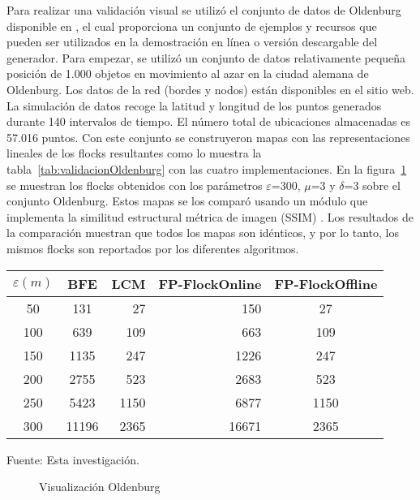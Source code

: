 Para realizar una validación visual se utilizó el conjunto de datos de Oldenburg disponible en \cite{Brin:2010:Online}, el cual proporciona un conjunto de ejemplos y 
recursos que pueden ser utilizados en la demostración en línea o 
versión descargable del generador. Para empezar, se utilizó un conjunto de datos relativamente pequeña posición de 1.000 objetos en movimiento 
al azar en la ciudad alemana de Oldenburg. Los datos de la red (bordes y nodos) están disponibles en el sitio web. La simulación de datos recoge la latitud y longitud de los puntos generados durante 140 intervalos 
de tiempo. El número total de ubicaciones almacenadas es 57.016 puntos. Con este conjunto se construyeron mapas con las representaciones lineales de 
los flocks resultantes como lo muestra la tabla~\ref{tab:validacionOldenburg} con las cuatro implementaciones.
En la figura~\ref{fig:validation} se muestran los flocks obtenidos con los parámetros $\varepsilon$=300, $\mu$=3 y $\delta$=3 sobre el conjunto Oldenburg.
Estos mapas se los comparó usando un 
módulo que implementa la similitud estructural métrica de imagen (SSIM) 
\cite{Zhou2004}. Los resultados de la comparación muestran que todos los mapas son 
idénticos, y por lo tanto, los mismos flocks son reportados por los diferentes 
algoritmos.


\begin{table*}
\caption{Número de flocks generados por los algoritmos en el conjunto de Oldenburg $\mu$=3, $\delta$=3}
\label{tab:validacionOldenburg}
\centering
\begin{tabular}{c c r r c}
\toprule
$\varepsilon(m)$& BFE & LCM & FP-FlockOnline & FP-FlockOffline \\  

\midrule
50 & 131 & 27 & 150 & 27 \\
100 & 639 & 109 & 663 & 109 \\
150 & 1135 & 247 & 1226 & 247 \\
200 & 2755 & 523 & 2683 & 523 \\
250 & 5423 & 1150 & 6877 & 1150 \\
300 & 11196 & 2365 & 16671 & 2365 \\
\bottomrule
\end{tabular}\par
\bigskip
Fuente: Esta investigación.
\end{table*}


\begin{figure}
  \centering
  
  \caption{Visualización Oldenburg}
  \label{fig:validation}
\end{figure}
